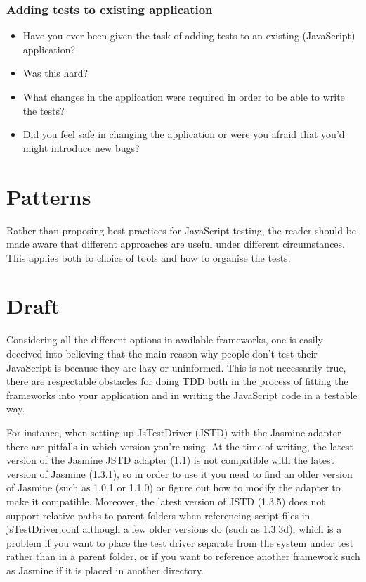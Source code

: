 \documentclass[11pt]{article}
\begin{document}
\subsubsection{Adding tests to existing application}
\begin{itemize}
\item Have you ever been given the task of adding tests to an existing (JavaScript) application?
\item Was this hard?
\item What changes in the application were required in order to be able to write the tests?
\item Did you feel safe in changing the application or were you afraid that you'd might introduce new bugs?
\end{itemize}

\section{Patterns}

Rather than proposing best practices for JavaScript testing, the reader should be made aware that different approaches are useful under different circumstances. This applies both to choice of tools and how to organise the tests.

\section{Draft}

Considering all the different options in available frameworks, one is easily deceived into believing that the main reason why people don't test their JavaScript is because they are lazy or uninformed. This is not necessarily true, there are respectable obstacles for doing TDD both in the process of fitting the frameworks into your application and in writing the JavaScript code in a testable way.

For instance, when setting up JsTestDriver (JSTD)\cite{JsTestDriver} with the Jasmine adapter there are pitfalls in which version you're using. At the time of writing, the latest version of the Jasmine JSTD adapter (1.1) is not compatible with the latest version of Jasmine (1.3.1), so in order to use it you need to find an older version of Jasmine (such as 1.0.1 or 1.1.0) or figure out how to modify the adapter to make it compatible. Moreover, the latest version of JSTD (1.3.5) does not support relative paths to parent folders when referencing script files in jsTestDriver.conf although a few older versions do (such as 1.3.3d), which is a problem if you want to place the test driver separate from the system under test rather than in a parent folder, or if you want to reference another framework such as Jasmine if it is placed in another directory.
\end{document}
